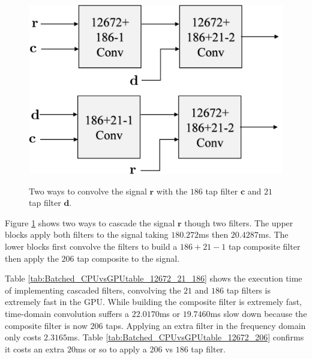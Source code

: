 \begin{figure}
	\centering\includegraphics[width=5.01in/100*55]{figures/gpu_intro/twoWaysToConv.pdf}
	\label{fig:twoWaysToConv}
	\caption{Two ways to convolve the signal $\mathbf{r}$ with the $186$ tap filter $\mathbf{c}$ and $21$ tap filter $\mathbf{d}$.}
\end{figure}
Figure \ref{fig:twoWaysToConv} shows two ways to cascade the signal $\mathbf{r}$ though two filters.
The upper blocks apply both filters to the signal taking $180.272$ms then $20.4287$ms.
The lower blocks first convolve the filters to build a $186+21-1$ tap composite filter then apply the $206$ tap composite to the signal.

Table \ref{tab:Batched_CPUvsGPUtable_12672_21_186} shows the execution time of implementing cascaded filters, convolving the $21$ and $186$ tap filters is extremely fast in the GPU.
While building the composite filter is extremely fast, time-domain convolution suffers a $22.0170$ms or $19.7460$ms slow down because the composite filter is now $206$ taps.
Applying an extra filter in the frequency domain only costs $2.3165$ms.
Table \ref{tab:Batched_CPUvsGPUtable_12672_206} confirms it costs an extra $20$ms or so to apply a $206$ vs $186$ tap filter.

